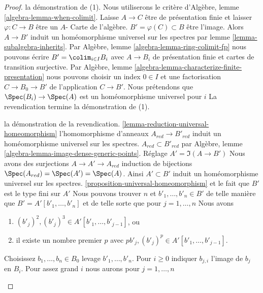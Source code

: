 \begin{proof}

la démonstration de (1). Nous utiliserons le critère d'Algèbre, lemme \ref{algebra-lemma-when-colimit}. Laisse $A \to C$ être de présentation finie et laisser $\varphi : C \to B$
être un $A$- Carte de l'algèbre. $B' = \varphi(C) \subset B$ être l'image. Alors $A \to B'$ induit un homéomorphisme universel sur les spectres par lemme \ref{lemma-subalgebra-inherits}. Par Algèbre, lemme \ref{algebra-lemma-ring-colimit-fp}
nous pouvons écrire $B' = \colim_{i \in I} B_i$
avec $A \to B_i$ de présentation finie et cartes de transition surjective. Par Algèbre, lemme \ref{algebra-lemma-characterize-finite-presentation}
nous pouvons choisir un index $0 \in I$
et une factorisation $C \to B_0 \to B'$ de l'application $C \to B'$. Nous prétendons que $\Spec(B_i) \to \Spec(A)$ est un homéomorphisme universel pour $i$ La revendication termine la démonstration de (1).

\medskip\noindent

la démonstration de la revendication. \ref{lemma-reduction-universal-homeomorphism}
l'homomorphisme d'anneaux $A_{red} \to B'_{red}$ induit un homéomorphisme universel sur les spectres. $A_{red} \subset B'_{red}$ par Algèbre, lemme \ref{algebra-lemma-image-dense-generic-points}. Réglage $A' = \Im(A \to B')$ Nous avons des surjections $A \to A' \to A_{red}$
induction de bijections $\Spec(A_{red}) = \Spec(A') = \Spec(A)$. Ainsi $A' \subset B'$ induit un homéomorphisme universel sur les spectres. \ref{proposition-universal-homeomorphism}
et le fait que $B'$ est le type fini sur $A'$ Nous pouvons trouver $n$ et $b'_1, \ldots, b'_n \in B'$ de telle manière que
$B' = A'[b'_1, \ldots, b'_n]$
et de telle sorte que pour $j = 1, \ldots, n$ Nous avons

\begin{enumerate}

\item  $(b'_j)^2, (b'_j)^3 \in A'[b'_1, \ldots, b'_{j - 1}]$, ou
\item il existe un nombre premier $p$ avec
$pb'_j, (b'_j)^p \in A'[b'_1, \ldots, b'_{j - 1}]$.

\end{enumerate}

Choisissez $b_1, \ldots, b_n \in B_0$ levage $b'_1, \ldots, b'_n$. Pour $i \geq 0$ indiquer $b_{j, i}$ l'image de $b_j$ en $B_i$. Pour assez grand $i$ nous aurons pour $j = 1, \ldots, n$

\begin{enumerate}


\end{enumerate}
\end{proof}

